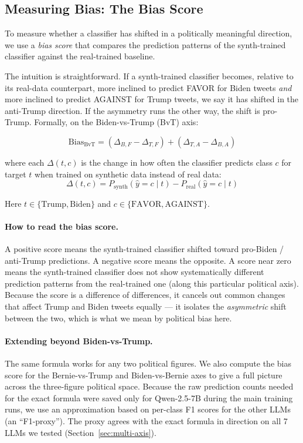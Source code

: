 \documentclass[11pt]{article}
\begin{document}
\subsection{Measuring Bias: The Bias Score}

To measure whether a classifier has shifted in a politically meaningful direction, we use a \emph{bias score} that compares the prediction patterns of the synth-trained classifier against the real-trained baseline.

The intuition is straightforward. If a synth-trained classifier becomes, relative to its real-data counterpart, more inclined to predict FAVOR for Biden tweets \emph{and} more inclined to predict AGAINST for Trump tweets, we say it has shifted in the anti-Trump direction. If the asymmetry runs the other way, the shift is pro-Trump. Formally, on the Biden-vs-Trump (BvT) axis:

\begin{equation}
\label{eq:bias}
\mathrm{Bias}_{\mathrm{BvT}} = (\Delta_{B,F} - \Delta_{T,F}) + (\Delta_{T,A} - \Delta_{B,A})
\end{equation}

\noindent where each $\Delta(t,c)$ is the change in how often the classifier predicts class $c$ for target $t$ when trained on synthetic data instead of real data:
\begin{equation}
\Delta(t,c) = P_{\mathrm{synth}}(\hat{y} = c \mid t) - P_{\mathrm{real}}(\hat{y} = c \mid t)
\end{equation}

\noindent Here $t \in \{\text{Trump}, \text{Biden}\}$ and $c \in \{\text{FAVOR}, \text{AGAINST}\}$.

\paragraph{How to read the bias score.}
A positive score means the synth-trained classifier shifted toward pro-Biden / anti-Trump predictions. A negative score means the opposite. A score near zero means the synth-trained classifier does not show systematically different prediction patterns from the real-trained one (along this particular political axis). Because the score is a difference of differences, it cancels out common changes that affect Trump and Biden tweets equally --- it isolates the \emph{asymmetric} shift between the two, which is what we mean by political bias here.

\paragraph{Extending beyond Biden-vs-Trump.} The same formula works for any two political figures. We also compute the bias score for the Bernie-vs-Trump and Biden-vs-Bernie axes to give a full picture across the three-figure political space. Because the raw prediction counts needed for the exact formula were saved only for Qwen-2.5-7B during the main training runs, we use an approximation based on per-class F1 scores for the other LLMs (an ``F1-proxy''). The proxy agrees with the exact formula in direction on all 7 LLMs we tested (Section~\ref{sec:multi-axis}).
\end{document}

